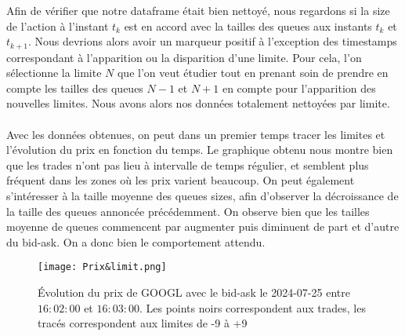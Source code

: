 \documentclass[12pt,a4paper]{article}
\theoremstyle{definition}
\theoremstyle{remark}
\begin{document}
Afin de vérifier que notre dataframe était bien nettoyé, nous regardons si la size de l'action à l'instant $t_k$ est en accord avec la tailles des queues aux instants $t_k$ et $t_{k+1}$. Nous devrions alors avoir un marqueur positif à l’exception des timestamps correspondant à l'apparition ou la disparition d'une limite. Pour cela, l'on sélectionne la limite $N$ que l'on veut étudier tout en prenant soin de prendre en compte les tailles des queues $N-1$ et $N+1$ en compte pour l'apparition des nouvelles limites. Nous avons alors nos données totalement nettoyées par limite. 
\\
\\
Avec les données obtenues, on peut dans un premier temps tracer les limites et l'évolution du prix en fonction du temps. Le graphique obtenu nous montre bien que les trades n'ont pas lieu à intervalle de temps régulier, et semblent plus fréquent dans les zones où les prix varient beaucoup.
On peut également s'intéresser à la taille moyenne des queues sizes, afin d'observer la décroissance de la taille des queues annoncée précédemment. On observe bien que les tailles moyenne de queues commencent par augmenter puis diminuent de part et d'autre du bid-ask. On a donc bien le comportement attendu.
\begin{figure}[h!]
    \centering
    \texttt{[image: Prix\&limit.png]}
    \caption{Évolution du prix de GOOGL avec le bid-ask le 2024-07-25 entre $16:02:00$ et $16:03:00$. Les points noirs correspondent aux trades, les tracés correspondent aux limites de -9 à +9}
    \label{fig:graph}
\end{figure}
\end{document}

